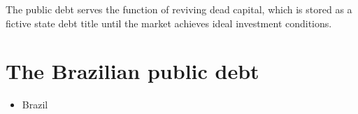 The public debt serves the function of reviving dead capital, which is stored as a fictive state debt title until the market achieves ideal investment conditions.
\section{The Brazilian public debt}

\begin{itemize}
    \item Brazil
\end{itemize}
